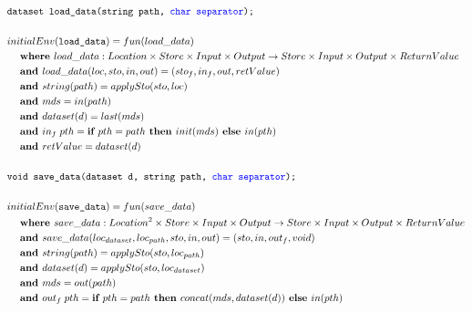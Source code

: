 \documentclass[12pt]{article}
\newcommand{\blu}{\textcolor{blue}}
\begin{document}
\begin{align*}
	&\texttt{dataset load\_data(string path, \blu{char separator});} \\
	\\
&initialEnv(\texttt{load\_data}) = fun(load\_data) \\
&\hspace{3ex}\textbf{where } load\_data:Location\times Store\times Input\times Output\rightarrow Store\times Input\times Output\times ReturnValue \\
&\hspace{3ex}\textbf{and } load\_data(loc,sto,in,out) = (sto_f,in_f,out, retValue)\\
&\hspace{3ex}\textbf{and } string(path) = applySto(sto,loc) \\
&\hspace{3ex}\textbf{and } mds = in(path) \\
&\hspace{3ex}\textbf{and } dataset(d) = last(mds) \\
&\hspace{3ex}\textbf{and } in_f\; pth = \textbf{if } pth = path \textbf{ then } init(mds)\textbf{ else } in(pth) \\
&\hspace{3ex}\textbf{and } retValue = dataset(d)\\
\\
	&\texttt{void save\_data(dataset d, string path, \blu{char separator});} \\
	\\
&initialEnv(\texttt{save\_data}) = fun(save\_data) \\
&\hspace{3ex}\textbf{where } save\_data:Location^2\times Store\times Input\times Output\rightarrow Store\times Input\times Output\times ReturnValue \\
&\hspace{3ex}\textbf{and } save\_data(loc_{dataset}, loc_{path},sto,in,out) = (sto,in,out_f, void)\\
&\hspace{3ex}\textbf{and } string(path) = applySto(sto,loc_{path}) \\
&\hspace{3ex}\textbf{and } dataset(d) = applySto(sto,loc_{dataset}) \\
&\hspace{3ex}\textbf{and } mds = out(path) \\
&\hspace{3ex}\textbf{and } out_f\; pth = \textbf{if } pth = path \textbf{ then } concat(mds, dataset(d))\textbf{ else } in(pth) \\
\end{align*}
\end{document}
